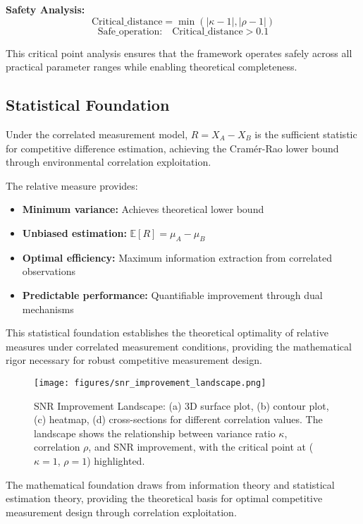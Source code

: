 \textbf{Safety Analysis:}
\begin{equation}
\text{Critical\_distance} = \min(|\kappa - 1|, |\rho - 1|)
\end{equation}
\begin{equation}
\text{Safe\_operation:} \quad \text{Critical\_distance} > 0.1
\end{equation}

This critical point analysis ensures that the framework operates safely across all practical parameter ranges while enabling theoretical completeness.

\subsection{Statistical Foundation}

Under the correlated measurement model, $R = X_A - X_B$ is the sufficient statistic for competitive difference estimation, achieving the Cramér-Rao lower bound through environmental correlation exploitation.

The relative measure provides:
\begin{itemize}
    \item \textbf{Minimum variance:} Achieves theoretical lower bound
    \item \textbf{Unbiased estimation:} $\mathbb{E}[R] = \mu_A - \mu_B$
    \item \textbf{Optimal efficiency:} Maximum information extraction from correlated observations
    \item \textbf{Predictable performance:} Quantifiable improvement through dual mechanisms
\end{itemize}

This statistical foundation establishes the theoretical optimality of relative measures under correlated measurement conditions, providing the mathematical rigor necessary for robust competitive measurement design.

\begin{figure}[h]
\centering
\texttt{[image: figures/snr\_improvement\_landscape.png]}
\caption{SNR Improvement Landscape: (a) 3D surface plot, (b) contour plot, (c) heatmap, (d) cross-sections for different correlation values. The landscape shows the relationship between variance ratio $\kappa$, correlation $\rho$, and SNR improvement, with the critical point at ($\kappa=1$, $\rho=1$) highlighted.}
\label{fig:snr_landscape}
\end{figure}

The mathematical foundation draws from information theory \cite{shannon1948mathematical} and statistical estimation theory, providing the theoretical basis for optimal competitive measurement design through correlation exploitation.
